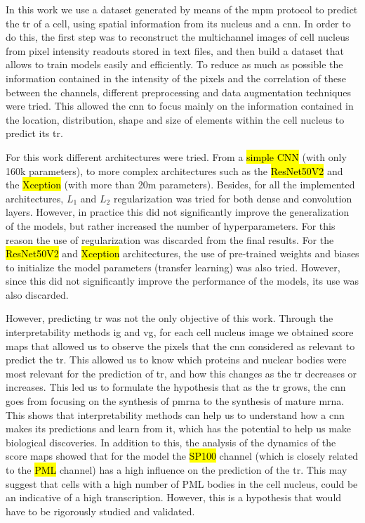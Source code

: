 
\glsresetall

In this work we use a dataset generated by means of the \gls{mpm} protocol to predict the \gls{tr} of a cell, using spatial information from its nucleus and a \gls{cnn}. In order to do this, the first step was to reconstruct the multichannel images of cell nucleus from pixel intensity readouts stored in text files, and then build a dataset that allows to train models easily and efficiently.
To reduce as much as possible the information contained in the intensity of the pixels and the correlation of these between the channels, different preprocessing and data augmentation techniques were tried. This allowed the \gls{cnn} to focus mainly on the information contained in the location, distribution, shape and size of elements within the cell nucleus to predict its \gls{tr}.

For this work different architectures were tried. From a \hl{simple CNN} (with only 160k parameters), to more complex architectures such as the \hl{ResNet50V2} and the \hl{Xception} (with more than 20m parameters).
Besides, for all the implemented architectures, $L_1$ and $L_2$ regularization was tried for both dense and convolution layers. However, in practice this did not significantly improve the generalization of the models, but rather increased the number of hyperparameters. For this reason the use of regularization was discarded from the final results.
For the \hl{ResNet50V2} and \hl{Xception} architectures, the use of pre-trained weights and biases to initialize the model parameters (transfer learning) was also tried. However, since this did not significantly improve the performance of the models, its use was also discarded.

However, predicting \gls{tr} was not the only objective of this work.
Through the interpretability methods \gls{ig} and \gls{vg}, for each cell nucleus image we obtained score maps that allowed us to observe the pixels that the \gls{cnn} considered as relevant to predict the \gls{tr}.
This allowed us to know which proteins and nuclear bodies were most relevant for the prediction of \gls{tr}, and how this changes as the \gls{tr} decreases or increases.
This led us to formulate the hypothesis that as the \gls{tr} grows, the \gls{cnn} goes from focusing on the synthesis of \gls{pmrna} to the synthesis of mature \gls{mrna}.
This shows that interpretability methods can help us to understand how a \gls{cnn} makes its predictions and learn from it, which has the potential to help us make biological discoveries.
In addition to this, the analysis of the dynamics of the score maps showed that for the model the \hl{SP100} channel (which is closely related to the \hl{PML} channel) has a high influence on the prediction of the \gls{tr}. This may suggest that cells with a high number of PML bodies in the cell nucleus, could be an indicative of a high transcription. However, this is a hypothesis that would have to be rigorously studied and validated.

